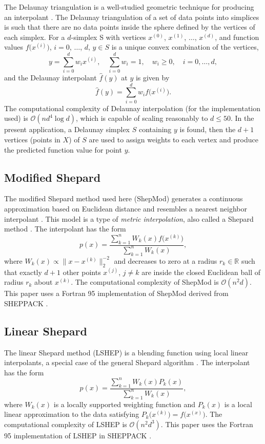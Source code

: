 \documentclass[smallextended,final]{svjour3}       %
\begin{document}
The Delaunay triangulation is a well-studied geometric technique for producing an interpolant \cite{lee1980two}. The Delaunay triangulation of a set of data points into simplices is such that there are no data points inside the sphere defined by the vertices of each simplex. For a $d$-simplex S with vertices $x^{(0)}$, $x^{(1)}$, $\ldots$, $x^{(d)}$, and function values $f\bigl(x^{(i)}\bigr)$, $i=0$, $\ldots$, $d$, $y \in S$ is a unique convex combination of the vertices,
$$ y = \sum_{i=0}^{d} w_i x^{(i)}, \quad \sum_{i=0}^{d} w_i = 1, \quad w_i \geq 0, \quad i=0,\ldots,d, $$
and the Delaunay interpolant $\hat f(y)$ at $y$ is given by
$$ \hat f(y) = \sum_{i=0}^{d} w_i f\bigl(x^{(i)}\bigr). $$
The computational complexity of Delaunay interpolation (for the implementation used) is $\mathcal{O}(n d^4 \log d)$, which is capable of scaling reasonably to $d \leq 50$. In the present application, a Delaunay simplex $S$ containing $y$ is found, then the $d+1$ vertices (points in $X$) of $S$ are used to assign weights to each vertex and produce the predicted function value for point $y$.

\newpage
\subsection{Modified Shepard}
\label{sec:modified-shepard}

The modified Shepard method used here (ShepMod) generates a continuous approximation based on Euclidean distance and resembles a nearest neighbor interpolant \cite{cover1967nearest}. This model is a type of \textit{metric interpolation}, also called a Shepard method \cite{shepard1968two,gordon1978shepard}. The interpolant has the form
$$ p(x) = \frac{\sum\limits_{k=1}^{n}W_k(x)f\bigl(x^{(k)}\bigr)}{\sum\limits_{k=1}^{n}W_k(x)} ,$$
where $W_k(x) \propto \bigl\|x - x^{(k)}\bigr\|_2^{-2}$ and decreases to zero at a radius $r_k \in \mathbb{R}$ such that exactly $d+1$ other points $x^{(j)}$, $j \not = k$ are inside the closed Euclidean ball of radius $r_k$ about $x^{(k)}$. The computational complexity of ShepMod is $\mathcal{O}(n^2d)$. This paper uses a Fortran 95 implementation of ShepMod derived from SHEPPACK \cite{thacker2010algorithm}.

\subsection{Linear Shepard}
The linear Shepard method (LSHEP) is a blending function using local linear interpolants, a special case of the general Shepard algorithm \cite{thacker2010algorithm}. The interpolant has the form
$$ p(x) = \frac{\sum\limits_{k=1}^{n}W_k(x)P_k(x)}{\sum\limits_{k=1}^{n}W_k(x)} ,$$
where $W_k(x)$ is a locally supported weighting function and $P_k(x)$ is a local linear approximation to the data satisfying $P_k\bigl(x^{(k)}\bigr) = f\bigl(x^{(x)}\bigr)$. The computational complexity of LSHEP is $\mathcal{O}(n^2d^3)$. This paper uses the Fortran 95 implementation of LSHEP in SHEPPACK \cite{thacker2010algorithm}.
\end{document}
